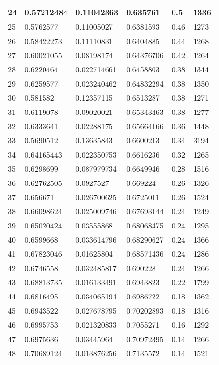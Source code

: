 \begin{longtable}{|l|l|l|l|l|l|}
24 & 0.57212484 & 0.11042363 & 0.635761 & 0.5 & 1336 \\ \hline 
25 & 0.5762577 & 0.11005027 & 0.6381593 & 0.46 & 1273 \\ \hline 
26 & 0.58422273 & 0.11110831 & 0.6404885 & 0.44 & 1268 \\ \hline 
27 & 0.60021055 & 0.08198174 & 0.64376706 & 0.42 & 1264 \\ \hline 
28 & 0.6220464 & 0.022714661 & 0.6458803 & 0.38 & 1344 \\ \hline 
29 & 0.6259577 & 0.023240462 & 0.64832294 & 0.38 & 1350 \\ \hline 
30 & 0.581582 & 0.12357115 & 0.6513287 & 0.38 & 1271 \\ \hline 
31 & 0.6119078 & 0.09020021 & 0.65343463 & 0.38 & 1277 \\ \hline 
32 & 0.6333641 & 0.02288175 & 0.65664166 & 0.36 & 1448 \\ \hline 
33 & 0.5690512 & 0.13635843 & 0.6600213 & 0.34 & 3194 \\ \hline 
34 & 0.64165443 & 0.022350753 & 0.6616236 & 0.32 & 1265 \\ \hline 
35 & 0.6298699 & 0.087979734 & 0.6649946 & 0.28 & 1516 \\ \hline 
36 & 0.62762505 & 0.0927527 & 0.669224 & 0.26 & 1326 \\ \hline 
37 & 0.656671 & 0.026700625 & 0.6725011 & 0.26 & 1524 \\ \hline 
38 & 0.66098624 & 0.025009746 & 0.67693144 & 0.24 & 1249 \\ \hline 
39 & 0.65020424 & 0.03555868 & 0.68068475 & 0.24 & 1295 \\ \hline 
40 & 0.6599668 & 0.033614796 & 0.68290627 & 0.24 & 1366 \\ \hline 
41 & 0.67823046 & 0.01625804 & 0.68571436 & 0.24 & 1286 \\ \hline 
42 & 0.6746558 & 0.032485817 & 0.690228 & 0.24 & 1266 \\ \hline 
43 & 0.68813735 & 0.016133491 & 0.6943823 & 0.22 & 1799 \\ \hline 
44 & 0.6816495 & 0.034065194 & 0.6986722 & 0.18 & 1362 \\ \hline 
45 & 0.6943522 & 0.027678795 & 0.70202893 & 0.18 & 1316 \\ \hline 
46 & 0.6995753 & 0.021320833 & 0.7055271 & 0.16 & 1292 \\ \hline 
47 & 0.6975636 & 0.03445964 & 0.70972395 & 0.14 & 1266 \\ \hline 
48 & 0.70689124 & 0.013876256 & 0.7135572 & 0.14 & 1521 \\ \hline 

\end{longtable}

